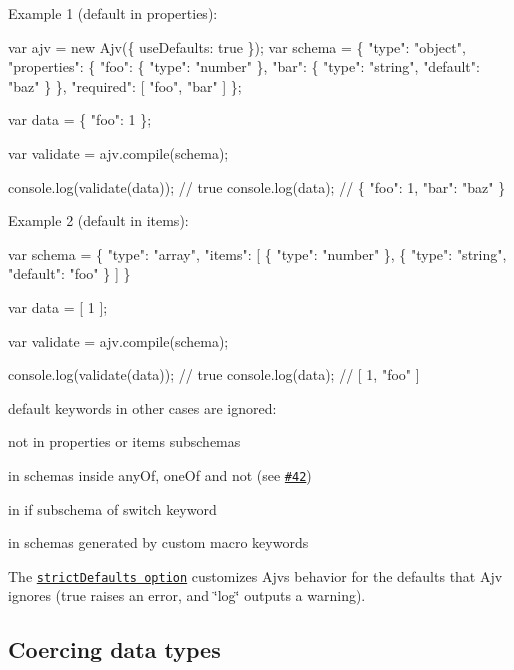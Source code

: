 Example 1 ({\ttfamily default} in {\ttfamily properties})\+:


\begin{DoxyCode}
var ajv = new Ajv(\{ useDefaults: true \});
var schema = \{
  "type": "object",
  "properties": \{
    "foo": \{ "type": "number" \},
    "bar": \{ "type": "string", "default": "baz" \}
  \},
  "required": [ "foo", "bar" ]
\};

var data = \{ "foo": 1 \};

var validate = ajv.compile(schema);

console.log(validate(data)); // true
console.log(data); // \{ "foo": 1, "bar": "baz" \}
\end{DoxyCode}


Example 2 ({\ttfamily default} in {\ttfamily items})\+:


\begin{DoxyCode}
var schema = \{
  "type": "array",
  "items": [
    \{ "type": "number" \},
    \{ "type": "string", "default": "foo" \}
  ]
\}

var data = [ 1 ];

var validate = ajv.compile(schema);

console.log(validate(data)); // true
console.log(data); // [ 1, "foo" ]
\end{DoxyCode}


{\ttfamily default} keywords in other cases are ignored\+:


\begin{DoxyItemize}
\item not in {\ttfamily properties} or {\ttfamily items} subschemas
\item in schemas inside {\ttfamily any\+Of}, {\ttfamily one\+Of} and {\ttfamily not} (see \href{https://github.com/epoberezkin/ajv/issues/42}{\tt \#42})
\item in {\ttfamily if} subschema of {\ttfamily switch} keyword
\item in schemas generated by custom macro keywords
\end{DoxyItemize}

The \href{#options}{\tt {\ttfamily strict\+Defaults} option} customizes Ajv\textquotesingle{}s behavior for the defaults that Ajv ignores ({\ttfamily true} raises an error, and {\ttfamily \char`\"{}log\char`\"{}} outputs a warning).

\subsection*{Coercing data types}

